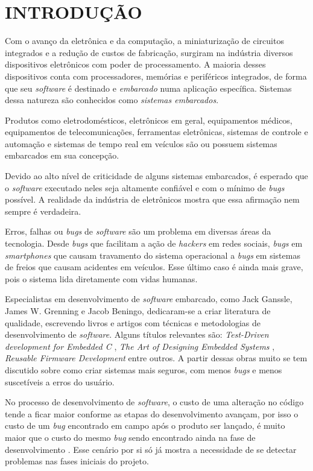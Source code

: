 \documentclass[times, twoside, watermark]{artigo}
\begin{document}
\section{INTRODUÇÃO}
Com o avanço da eletrônica e da computação, a miniaturização de circuitos integrados e a redução de custos de fabricação, 
surgiram na indústria diversos dispositivos eletrônicos com poder de processamento. 
A maioria desses dispositivos conta com processadores, memórias e periféricos integrados, 
de forma que seu \textit{software} é destinado e \textit{embarcado} numa aplicação específica. 
Sistemas dessa natureza são conhecidos como \textit{sistemas embarcados}.

Produtos como eletrodomésticos, eletrônicos em geral, equipamentos médicos, equipamentos de telecomunicações, 
ferramentas eletrônicas, sistemas de controle e automação e sistemas de tempo real em veículos são ou 
possuem sistemas embarcados em sua concepção.

Devido ao alto nível de criticidade de alguns sistemas embarcados, é esperado que o \textit{software} executado 
neles seja altamente confiável e com o mínimo de \textit{bugs} possível. A realidade da indústria de eletrônicos 
mostra que essa afirmação nem sempre é verdadeira.

Erros, falhas ou \textit{bugs} de \textit{software} são um problema em diversas áreas da tecnologia. 
Desde \textit{bugs} que facilitam a ação de \textit{hackers} em redes sociais, \textit{bugs} em 
\textit{smartphones} que causam travamento do sistema operacional a \textit{bugs} em sistemas de 
freios que causam acidentes em veículos. Esse último caso é ainda mais grave, pois o sistema lida diretamente com vidas humanas. 

Especialistas em desenvolvimento de \textit{software} embarcado, como Jack Ganssle, James W. Grenning e Jacob Beningo, 
dedicaram-se a criar literatura de qualidade, escrevendo livros e artigos com técnicas e metodologias de 
desenvolvimento de \textit{software}. Alguns títulos relevantes são: \textit{Test-Driven development for Embedded C} \cite{tddembeddedc},
\textit{The Art of Designing Embedded Systems} \cite{ganssle2008art}, \textit{Reusable Firmware Development} \cite{beningo2017reusable} entre outros. 
A partir dessas obras muito se tem discutido sobre como criar sistemas mais seguros, com menos \textit{bugs} e menos suscetíveis a erros do usuário.

No processo de desenvolvimento de \textit{software}, o custo de uma alteração no código tende a ficar maior conforme 
as etapas do desenvolvimento avançam, por isso o custo de um \textit{bug} encontrado em campo após o produto ser lançado, 
é muito maior que o custo do mesmo \textit{bug} sendo encontrado ainda na fase de desenvolvimento \cite{firmwarecost}.
Esse cenário por si só já mostra a necessidade de se detectar problemas nas fases iniciais do projeto.
\end{document}

